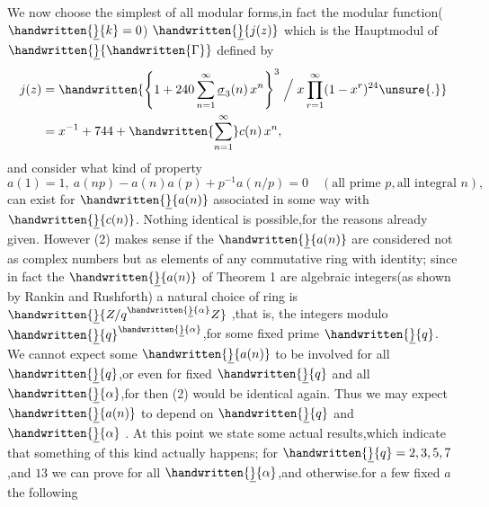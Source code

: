 We now choose the simplest of all modular forms,in fact the modular function($\handwritten{\underline}{k}=0$) $\handwritten{\underline}{j(z)}$ which is the Hauptmodul of $\handwritten{\underline}{\handwritten{\Gamma}}$ defined by
\[
\begin{aligned}
j(z)&=\handwritten{\left\{1+240\sum_{n=1}^{\infty}\underline{\sigma}_{3}(n)\,x^n\right\}^{3}\Bigm/ x\prod_{r=1}^{\infty}(1-x^{r})^{24}\unsure{.}}\\
&=x^{-1}+744+\handwritten{\sum_{n=1}^{\infty}}c(n)\,x^n,
\end{aligned}
\]
\reversemarginpar{}\normalmarginpar
and consider what kind of property
\[
a(1)=1,\ a(np)-a(n)a(p)+p^{-1}a(n/p)=0\quad (\text{all prime }p,\text{all integral }n),
\tag*{(2)}
\]
can exist for $\handwritten{\underline}{a(n)}$ associated in some way with $\handwritten{\underline}{c(n)}$. Nothing identical is possible,for the reasons already given. However (2) makes sense if the $\handwritten{\underline}{a(n)}$ are considered not as complex numbers but as elements of any commutative ring with identity; since in fact the $\handwritten{\underline}{a(n)}$ of Theorem 1 are algebraic integers(as shown by Rankin and Rushforth) a natural choice of ring is $\handwritten{\underline}{Z/q^{\handwritten{\underline}{\alpha}}Z}$ ,that is, the integers modulo $\handwritten{\underline}{q}^{\handwritten{\underline}{\alpha}}$,for some fixed prime $\handwritten{\underline}{q}$. We cannot expect some  $\handwritten{\underline}{a(n)}$ to be involved for all $\handwritten{\underline}{q}$,or even for fixed $\handwritten{\underline}{q}$ and all $\handwritten{\underline}{\alpha}$,for then (2) would be identical again. Thus we may expect $\handwritten{\underline}{a(n)}$ to depend on $\handwritten{\underline}{q}$ and $\handwritten{\underline}{\alpha}$ . At this point we  state some actual results,which indicate that something of this kind actually happens; for $\handwritten{\underline}{q}=2,3,5,7$,and $13$ we can prove for all $\handwritten{\underline}{\alpha}$,and otherwise.for a few fixed $a$ the following

